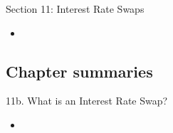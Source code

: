 \begin{ASM_chapter}
Section 11: Interest Rate Swaps
\begin{itemize}
	\item	{}
\end{itemize}
\end{ASM_chapter}

\subsection{Chapter summaries}

\begin{CHPT_SUMM_AUTO}[label = {L.-11b}]{11b. What is an Interest Rate Swap?}
	\begin{itemize}
		\item	
	\end{itemize}
\end{CHPT_SUMM_AUTO}